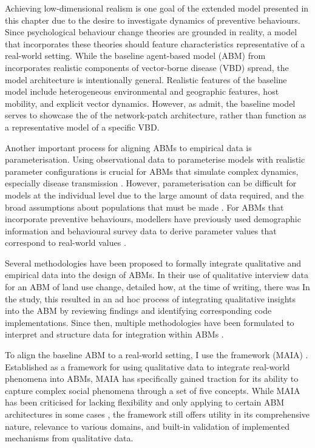 Achieving low-dimensional realism is one goal of the extended model presented in this chapter due to the desire to investigate dynamics of preventive behaviours. Since psychological behaviour change theories are grounded in reality, a model that incorporates these theories should feature characteristics representative of a real-world setting. While the baseline agent-based model (ABM) from \citet{manore_network-patch_2015} incorporates realistic components of vector-borne disease (VBD) spread, the model architecture is intentionally general. Realistic features of the baseline model include heterogeneous environmental and geographic features, host mobility, and explicit vector dynamics. However, as \citet{manore_network-patch_2015} admit, the baseline model serves to showcase the  of the network-patch architecture, rather than function as a representative model of a specific VBD.

Another important process for aligning ABMs to empirical data is parameterisation. Using observational data to parameterise models with realistic parameter configurations is crucial for ABMs that simulate complex dynamics, especially disease transmission \cite{judson_modeling_2024}. However, parameterisation can be difficult for models at the individual level due to the large amount of data required, and the broad assumptions about populations that must be made \cite{canales_agent-based_2024}. For ABMs that incorporate preventive behaviours, modellers have previously used demographic information and behavioural survey data to derive parameter values that correspond to real-world values \cite{weston_infection_2018}.%

Several methodologies have been proposed to formally integrate qualitative and empirical data into the design of ABMs. In their use of qualitative interview data for an ABM of land use change, \citet{polhill_using_2010} detailed how, at the time of writing, there was  In the study, this resulted in an ad hoc process of integrating qualitative insights into the ABM by reviewing findings and identifying corresponding code implementations. Since then, multiple methodologies have been formulated to interpret and structure data for integration within ABMs \cite{nespeca_methodology_2023}.

To align the baseline ABM to a real-world setting, I use the  framework (MAIA) \cite{ghorbani_maia_2013, ghorbani_structuring_2015}. Established as a framework for using qualitative data to integrate real-world phenomena into ABMs, MAIA has specifically gained traction for its ability to capture complex social phenomena through a set of five concepts. While MAIA has been criticised for lacking flexibility and only applying to certain ABM architectures in some cases \cite{nespeca_methodology_2023}, the framework still offers utility in its comprehensive nature, relevance to various domains, and built-in validation of implemented mechanisms from qualitative data.

